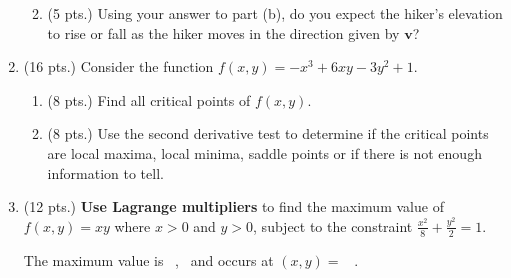 \documentclass{report}
\newcommand\dsp{\displaystyle}
\begin{document}
\begin{enumerate}
\begin{enumerate}
\vskip 5cm

\item (5 pts.) Using your answer to part (b), do you expect the hiker's elevation to rise or fall
as the hiker moves in the direction given by $\mathbf{v}$?

\vskip 2cm

\end{enumerate}

\newpage

\item (16 pts.) Consider the function $f(x,y) = -x^3 + 6xy - 3y^2 +1$.

\begin{enumerate}

\item (8 pts.) Find all critical points of $f(x,y)$.

\vskip 9cm

\item (8 pts.) Use the second derivative test to determine if the critical points are local maxima, local minima, saddle points or if there is not enough information to tell.

\end{enumerate}

\newpage

\item (12 pts.)  {\bf Use Lagrange multipliers} to find the maximum value of $\dsp f(x,y) = xy$ where $x>0$
and $y>0$, subject to the constraint $\dsp \frac{x^2}{8} + \frac{y^2}{2} = 1$.


\vfill

\hskip 1cm  The maximum value is ~\underbar{\hskip 2cm},~ and occurs at $(x,y) =$ ~\underbar{\hskip 5cm}.

\end{enumerate}
\end{document}

